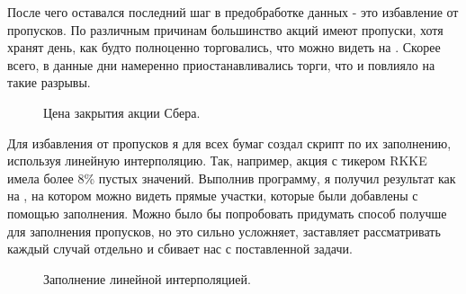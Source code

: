 \documentclass[12pt, a4paper]{article}
\begin{document}
После чего оставался последний шаг в предобработке данных - это избавление от пропусков. По различным причинам большинство акций имеют пропуски, хотя хранят день, как будто полноценно торговались, что можно видеть на . Скорее всего, в данные дни намеренно приостанавливались торги, что и повлияло на такие разрывы.
\begin{figure}[h!]
\caption{Цена закрытия акции Сбера.}
\label{fig:sber_with_misses}
\end{figure}

Для избавления от пропусков я для всех бумаг создал скрипт по их заполнению, используя линейную интерполяцию. Так, например, акция с тикером RKKE имела более 8\% пустых значений. Выполнив программу, я получил результат как на , на котором можно видеть прямые участки, которые были добавлены с помощью заполнения. Можно было бы попробовать придумать способ получше для заполнения пропусков, но это сильно усложняет, заставляет рассматривать каждый случай отдельно и сбивает нас с поставленной задачи.
\begin{figure}[!h]
\caption{Заполнение линейной интерполяцией.}
\label{fig:rkke_interpolate}
\end{figure}
\end{document}
